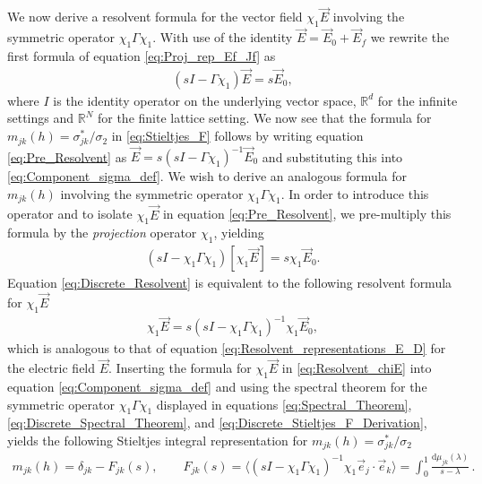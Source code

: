 \documentclass{cmslatex}
\renewcommand{\d}{\text{d}}
\begin{document}
We now derive a resolvent formula for the vector field
$\chi_1\vec{E}$ involving the symmetric operator $\chi_1\Gamma\chi_1$. With use of the
identity $\vec{E}=\vec{E}_0+\vec{E}_f$ we rewrite the first formula of
equation \eqref{eq:Proj_rep_Ef_Jf} as  
%
\begin{align}\label{eq:Pre_Resolvent}
  (sI-\Gamma\chi_1)\vec{E}=s\vec{E}_0,
\end{align}
%
where $I$ is the identity operator on the underlying vector space,
$\mathbb{R}^d$ for the infinite settings and $\mathbb{R}^N$ for the 
finite lattice setting. We now see that the formula for
$m_{jk}(h)=\sigma^*_{jk}/\sigma_2$ in \eqref{eq:Stieltjes_F} follows by writing
equation \eqref{eq:Pre_Resolvent} as
$\vec{E}=s(sI-\Gamma\chi_1)^{-1}\vec{E}_0$ and substituting this into 
\eqref{eq:Component_sigma_def}. We wish to derive an
analogous formula for $m_{jk}(h)$ involving the symmetric operator
$\chi_1\Gamma\chi_1$. In order to introduce this operator and to isolate
$\chi_1\vec{E}$ in equation \eqref{eq:Pre_Resolvent}, we pre-multiply
this formula by the \emph{projection} operator $\chi_1$, yielding 
%
\begin{align}\label{eq:Discrete_Resolvent}
  (sI-\chi_1\Gamma\chi_1)[\chi_1\vec{E}]=s\chi_1\vec{E}_0.
\end{align}
%
Equation \eqref{eq:Discrete_Resolvent} is equivalent to the following
resolvent formula for $\chi_1\vec{E}$
%
\begin{align}\label{eq:Resolvent_chiE}
  \chi_1\vec{E}=s(sI-\chi_1\Gamma\chi_1)^{-1}\chi_1\vec{E}_0,
\end{align}
%
which is analogous to that of equation
\eqref{eq:Resolvent_representations_E_D} for the electric field
$\vec{E}$. Inserting the formula for $\chi_1\vec{E}$ in
\eqref{eq:Resolvent_chiE} into equation \eqref{eq:Component_sigma_def}
and using the spectral theorem for the symmetric operator $\chi_1\Gamma\chi_1$
displayed in equations \eqref{eq:Spectral_Theorem},
\eqref{eq:Discrete_Spectral_Theorem}, and
\eqref{eq:Discrete_Stieltjes_F_Derivation}, yields the following
Stieltjes integral representation for $m_{jk}(h)=\sigma^*_{jk}/\sigma_2$
%
\begin{align}\label{eq:Stieltjes_m}
  m_{jk}(h)=\delta_{jk}-F_{jk}(s), \qquad
  F_{jk}(s)=\langle(sI-\chi_1\Gamma\chi_1)^{-1}\chi_1\vec{e}_j\cdot\vec{e}_k\rangle=\int_0^1\frac{\d\mu_{jk}(\lambda)}{s-\lambda}\,.
\end{align}
%
\end{document}
